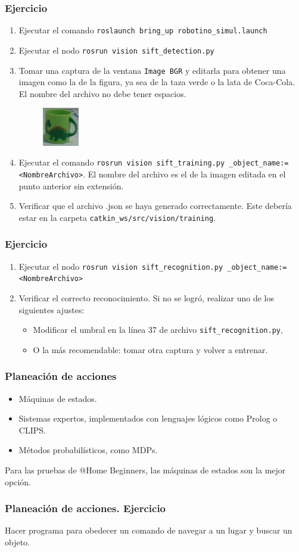 \documentclass[10pt,spanish,aspectratio=1610]{beamer}
\begin{document}
\begin{frame}\frametitle{Ejercicio}
  \begin{enumerate}
  \item Ejecutar el comando \texttt{roslaunch bring\_up robotino\_simul.launch}
  \item Ejecutar el nodo \texttt{rosrun vision sift\_detection.py}
  \item Tomar una captura de la ventana \texttt{Image BGR} y editarla para obtener una imagen como la de la figura, ya sea de la taza verde o la lata de Coca-Cola. El nombre del archivo no debe tener espacios.
    \begin{figure}
      \centering
      \includegraphics[width=0.15\textwidth]{Figures/GreenCup.png}
    \end{figure}
  \item Ejecutar el comando \texttt{rosrun vision sift\_training.py \_object\_name:=<NombreArchivo>}. El nombre del archivo es el de la imagen editada en el punto anterior sin extensión.
    \item Verificar que el archivo .json se haya generado correctamente. Este debería estar en la carpeta \texttt{catkin\_ws/src/vision/training}.
  \end{enumerate}
\end{frame}

\begin{frame}\frametitle{Ejercicio}
  \begin{enumerate}
  \item Ejecutar el nodo \texttt{rosrun vision sift\_recognition.py \_object\_name:=<NombreArchivo>}
  \item Verificar el correcto reconocimiento. Si no se logró, realizar uno de los siguientes ajustes:
    \begin{itemize}
    \item Modificar el umbral en la línea 37 de archivo \texttt{sift\_recognition.py},
      \item O la más recomendable: tomar otra captura y volver a entrenar. 
    \end{itemize}
  \end{enumerate}
\end{frame}

\begin{frame}\frametitle{Planeación de acciones}
  \begin{itemize}
  \item Máquinas de estados.
  \item Sistemas expertos, implementados con lenguajes lógicos como Prolog o CLIPS.
  \item Métodos probabilísticos, como MDPs.
  \end{itemize}
  Para las pruebas de @Home Beginners, las máquinas de estados son la mejor opción.
\end{frame}

\begin{frame}\frametitle{Planeación de acciones. Ejercicio}
Hacer programa para obedecer un comando de navegar a un lugar y buscar un objeto.
\end{frame}
\end{document}
